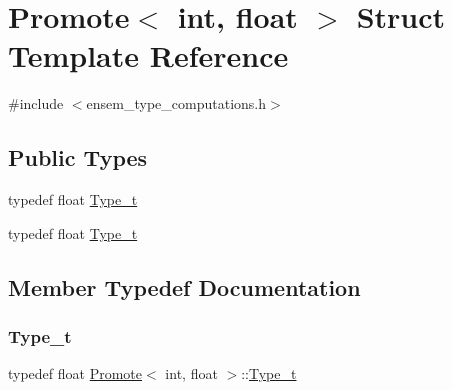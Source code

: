 \hypertarget{structPromote_3_01int_00_01float_01_4}{}\section{Promote$<$ int, float $>$ Struct Template Reference}
\label{structPromote_3_01int_00_01float_01_4}


{\ttfamily \#include $<$ensem\+\_\+type\+\_\+computations.\+h$>$}

\subsection*{Public Types}
\begin{DoxyCompactItemize}
\item 
typedef float \mbox{\hyperlink{structPromote_3_01int_00_01float_01_4_a368c812e2854d25d70464511b524bd9e}{Type\+\_\+t}}
\item 
typedef float \mbox{\hyperlink{structPromote_3_01int_00_01float_01_4_a368c812e2854d25d70464511b524bd9e}{Type\+\_\+t}}
\end{DoxyCompactItemize}


\subsection{Member Typedef Documentation}
\mbox{\label{structPromote_3_01int_00_01float_01_4_a368c812e2854d25d70464511b524bd9e}} 
\subsubsection{\texorpdfstring{Type\_t}{Type\_t}\hspace{0.1cm}{\footnotesize\ttfamily [1/2]}}
{\footnotesize\ttfamily typedef float \mbox{\hyperlink{structPromote}{Promote}}$<$ int, float $>$\+::\mbox{\hyperlink{structPromote_3_01int_00_01float_01_4_a368c812e2854d25d70464511b524bd9e}{Type\+\_\+t}}}

\mbox{\label{structPromote_3_01int_00_01float_01_4_a368c812e2854d25d70464511b524bd9e}} 
